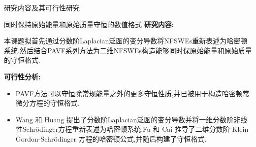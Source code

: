\documentclass[aspectratio=169]{beamer}
\begin{document}
\begin{frame}{研究内容及其可行性研究}
	\begin{block}{同时保持原始能量和原始质量守恒的数值格式}
		\textbf{\textcolor[rgb]{0.227,0.373,0.306}{研究内容:}}
		
		{\footnotesize 本课题拟首先通过分数阶Laplacian泛函的变分导数将NFSWEs重新表述为哈密顿系统.然后结合PAVF系列方法为二维NFSWEs构造能够同时保原始能量和原始质量的守恒格式.}
		
		\textbf{\textcolor[rgb]{0.227,0.373,0.306}{可行性分析:}}
		\begin{itemize}
			\item {\footnotesize PAVF方法可以守恒除常规能量之外的更多守恒性质,并已被用于构造哈密顿常微分方程的守恒格式\cite{caiPartitionedAveragedVector2018}.​​​​​​​​​​​​​​​​​​​​​​​​​​​​​​​​​​​​​​​​​​​​​​​​​​​​​​​​​​​​​​​​​​​​​​​​​​​​​​​​​​​​​​​​​​​​​​​​​​​​​​​​​​​​​​​​​​​​​​​​​​​​​​​​​​​​​​​​​​​​​​​​​​​​​​​​​​​​​​​​​​​​​​​​​​​​​​​​​​​​​​​​​​​​​​​​​​​​​​​​​​​​​​​​​​​​​​​​​​​​​​​​​​​​​​​​​​​​​​​​​​​​​​​​​​​​​​​​​​​​​​​​​​​​​​​​​​​​​​​​​​​​​​​​​​​​​​​​​​​​​​​​​​​​​​​​​​​​​​​​​​}
			\item {\footnotesize Wang 和 Huang \cite{wangStructurepreservingNumericalMethods2018} 提出了分数阶Laplacian泛函的变分导数并将一维分数阶非线性Schrödinger方程重新表述为哈密顿系统.Fu 和 Cai \cite{fuStructurepreservingAlgorithmsTwodimensional2020} 推导了二维分数阶 Klein-Gordon-Schrödinger 方程的哈密顿公式,并随后构建了守恒格式.}
			\end{itemize}
	\end{block}
	\end{frame}
	
\end{document}
